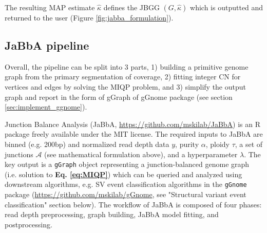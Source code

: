 \documentclass[phd,tocprelim]{cornell}
\renewcommand{\caption}[1]{\singlespacing\hangcaption{#1}\normalspacing}
\begin{document}

The resulting MAP estimate $\hat{\kappa}$ defines the JBGG $(G,\hat{\kappa})$ which is outputted and returned to the user (Figure \ref*{fig:jabba_formulation}).


\subsection{JaBbA pipeline}
Overall, the pipeline can be split into 3 parts, 1) building a primitive genome graph from the primary segmentation of coverage, 2) fitting integer CN for vertices and edges by solving the MIQP problem, and 3) simplify the output graph and report in the form of gGraph of gGnome package (see section \ref{sec:implement_ggnome}).

Junction Balance Analysis (JaBbA, \url{https://github.com/mskilab/JaBbA}) is an R package freely available under the MIT license. The required inputs to JaBbA are binned (e.g. 200bp) and normalized read depth data $y$, purity $\alpha$, ploidy $\tau$, a set of junctions $\mathcal{A}$ (see mathematical formulation above), and a hyperparameter $\lambda$. The key output is a \texttt{gGraph} object representing a junction-balanced genome graph (i.e. solution to \textbf{Eq. \ref{eq:MIQP}}) which can be queried and analyzed using downstream algorithms, e.g. SV event classification algorithms in the \texttt{gGnome} package (\url{https://github.com/mskilab/gGnome}, see "Structural variant event classification" section below). The workflow of JaBbA is composed of four phases: read depth preprocessing, graph building, JaBbA model fitting, and postprocessing.
\end{document}
